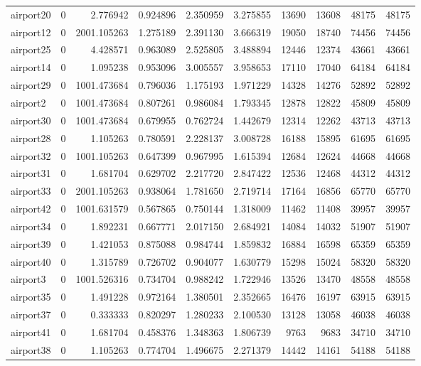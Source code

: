 \begin{longtable}{|l|r|r|r|r|r|r|r|r|r|}
airport20 & 0 & 2.776942 & 0.924896 & 2.350959 & 3.275855 & 13690 & 13608 & 48175 & 48175 \\
airport12 & 0 & 2001.105263 & 1.275189 & 2.391130 & 3.666319 & 19050 & 18740 & 74456 & 74456 \\
airport25 & 0 & 4.428571 & 0.963089 & 2.525805 & 3.488894 & 12446 & 12374 & 43661 & 43661 \\
airport14 & 0 & 1.095238 & 0.953096 & 3.005557 & 3.958653 & 17110 & 17040 & 64184 & 64184 \\
airport29 & 0 & 1001.473684 & 0.796036 & 1.175193 & 1.971229 & 14328 & 14276 & 52892 & 52892 \\
airport2 & 0 & 1001.473684 & 0.807261 & 0.986084 & 1.793345 & 12878 & 12822 & 45809 & 45809 \\
airport30 & 0 & 1001.473684 & 0.679955 & 0.762724 & 1.442679 & 12314 & 12262 & 43713 & 43713 \\
airport28 & 0 & 1.105263 & 0.780591 & 2.228137 & 3.008728 & 16188 & 15895 & 61695 & 61695 \\
airport32 & 0 & 1001.105263 & 0.647399 & 0.967995 & 1.615394 & 12684 & 12624 & 44668 & 44668 \\
airport31 & 0 & 1.681704 & 0.629702 & 2.217720 & 2.847422 & 12536 & 12468 & 44312 & 44312 \\
airport33 & 0 & 2001.105263 & 0.938064 & 1.781650 & 2.719714 & 17164 & 16856 & 65770 & 65770 \\
airport42 & 0 & 1001.631579 & 0.567865 & 0.750144 & 1.318009 & 11462 & 11408 & 39957 & 39957 \\
airport34 & 0 & 1.892231 & 0.667771 & 2.017150 & 2.684921 & 14084 & 14032 & 51907 & 51907 \\
airport39 & 0 & 1.421053 & 0.875088 & 0.984744 & 1.859832 & 16884 & 16598 & 65359 & 65359 \\
airport40 & 0 & 1.315789 & 0.726702 & 0.904077 & 1.630779 & 15298 & 15024 & 58320 & 58320 \\
airport3 & 0 & 1001.526316 & 0.734704 & 0.988242 & 1.722946 & 13526 & 13470 & 48558 & 48558 \\
airport35 & 0 & 1.491228 & 0.972164 & 1.380501 & 2.352665 & 16476 & 16197 & 63915 & 63915 \\
airport37 & 0 & 0.333333 & 0.820297 & 1.280233 & 2.100530 & 13128 & 13058 & 46038 & 46038 \\
airport41 & 0 & 1.681704 & 0.458376 & 1.348363 & 1.806739 & 9763 & 9683 & 34710 & 34710 \\
airport38 & 0 & 1.105263 & 0.774704 & 1.496675 & 2.271379 & 14442 & 14161 & 54188 & 54188 \\

\end{longtable}
